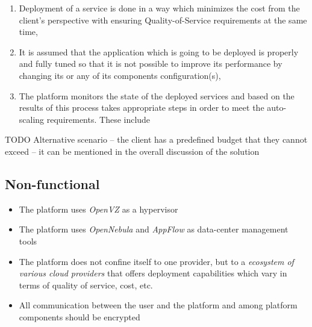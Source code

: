 \begin{enumerate}
\begin{itemize}
\begin{inparaenum}[i)]
      \end{inparaenum}
    \end{itemize}
  \item Deployment of a service is done in a way which minimizes the cost from the client's perspective with ensuring Quality-of-Service requirements at the same time,
  \item It is assumed that the application which is going to be deployed is properly and fully tuned so that it is not possible to improve its performance by changing its or any of its components configuration(s),
  \item The platform monitors the state of the deployed services and based on the results of this process takes appropriate steps in order to meet the auto-scaling requirements. These include
\end{enumerate}

TODO Alternative scenario -- the client has a predefined budget that they cannot exceed -- it can be mentioned in the overall discussion of the solution

\subsection{Non-functional}
\begin{itemize}
  \item The platform uses \emph{OpenVZ} as a hypervisor
  \item The platform uses \emph{OpenNebula} and \emph{AppFlow} as data-center management tools
  \item The platform does not confine itself to one provider, but to a \emph{ecosystem of various cloud providers} that offers deployment capabilities which vary in terms of quality of service, cost, etc.
  \item All communication between the user and the platform and among platform components should be encrypted
\end{itemize}

